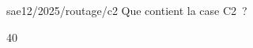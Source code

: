 \begin{question}{sae12/2025/routage/c2}
  Que contient la case C2~?
  \begin{reponses}{4}{0}
  \end{reponses}
\end{question}
